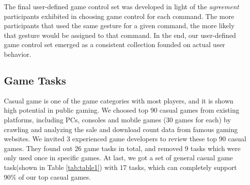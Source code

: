 \documentclass{sigchi}
\begin{document}
    The final user-defined game control set was developed in light of the \textsl{agreement} participants exhibited in choosing game control for each command\cite{Wobbrock:2005:MGS:1056808.1057043}. The more participants that used the same gesture for a given command, the more likely that gesture would be assigned to that command. In the end, our user-defined game control set emerged as a consistent collection founded on actual user behavior.


    \subsection {Game Tasks}

    Casual game is one of the game categories with most players\cite{esa_ef_2014}, and it is shown high potential in public gaming\cite{Jurgelionis:2011:PET:2027456.2027462,Reis:2012:EMC:2405577.2405651,Biskupski:2014:DEB:2559206.2580097}. We choosed top 90 casual games\cite{TopGames} from existing platforms, including PCs, consoles and mobile games (30 games for each) by crawling and analyzing the sale and download count data from famous gaming websites\cite{appannie,VGChartz,Steam,GameStop}. We invited 3 experienced game developers to review these top 90 casual games. They found out 26 game tasks in total, and removed 9 tasks which were only used once in specific games. At last, we got a set of general casual game task(shown in Table \ref{tab:table1}) with 17 tasks, which can completely support 90\% of our top casual games. 
\end{document}

